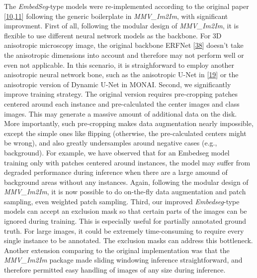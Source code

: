 The \emph{EmbedSeg}-type models were re-implemented according to the original paper {[}\protect\hyperlink{ref-K2ugNcVa}{10},\protect\hyperlink{ref-QmYuUQ5K}{11}{]} following the generic boilerplate in \emph{MMV\_Im2Im}, with significant improvment. First of all, following the modular design of \emph{MMV\_Im2Im}, it is flexible to use different neural network models as the backbone. For 3D anisotropic microscopy image, the original backbone ERFNet {[}\protect\hyperlink{ref-XAkgs3Nh}{38}{]} doesn't take the anisotropic dimensions into account and therefore may not perform well or even not applicable. In this scenario, it is straighforward to employ another anisotropic neural network bone, such as the anisotropic U-Net in {[}\protect\hyperlink{ref-jM3v1UjQ}{19}{]} or the anisotropic version of Dynamic U-Net in MONAI. Second, we significantly improve training strategy. The original version requires pre-cropping patches centered around each instance and pre-calculated the center images and class images. This may generate a massive amount of additional data on the disk. More importantly, such pre-cropping makes data augmentation nearly impossible, except the simple ones like flipping (otherwise, the pre-calculated centers might be wrong), and also greatly undersamples around negative cases (e.g., background). For example, we have observed that for an Embedseg model training only with patches centered around instances, the model may suffer from degraded performance during inference when there are a large amound of background areas without any instances. Again, following the modular design of \emph{MMV\_Im2Im}, it is now possible to do on-the-fly data augmentation and patch sampling, even weighted patch sampling. Third, our improved \emph{Embedseg}-type models can accept an exclusion mask so that certain parts of the images can be ignored during training. This is especially useful for partially annotated ground truth. For large images, it could be extremely time-consuming to require every single instance to be annotated. The exclusion masks can address this bottleneck. Another extension comparing to the original implementation was that the \emph{MMV\_Im2Im} package made sliding windowing inference straightforward, and therefore permitted easy handling of images of any size during inference.

